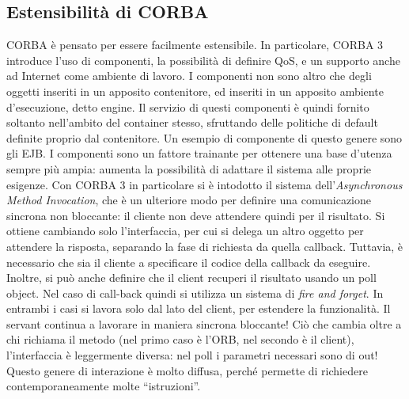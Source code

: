\subsection{Estensibilità di CORBA}
CORBA è pensato per essere facilmente estensibile. In particolare, CORBA 3 introduce l'uso di componenti, la possibilità
di definire QoS, e un supporto anche ad Internet come ambiente di lavoro.
I componenti non sono altro che degli oggetti inseriti in un apposito contenitore, ed inseriti in un apposito ambiente
d'esecuzione, detto engine. Il servizio di questi componenti è quindi fornito soltanto nell'ambito del container stesso,
sfruttando delle politiche di default definite proprio dal contenitore. Un esempio di componente di questo genere sono
gli EJB.
I componenti sono un fattore trainante per ottenere una base d'utenza sempre più ampia: aumenta la possibilità di
adattare il sistema alle proprie esigenze.
Con CORBA 3 in particolare si è intodotto il sistema dell'\textit{Asynchronous Method Invocation}, che è un ulteriore
modo per definire una comunicazione sincrona non bloccante: il cliente non deve attendere quindi per il risultato.
Si ottiene cambiando solo l'interfaccia, per cui si delega un altro oggetto per attendere la risposta, separando la fase
di richiesta da quella callback. Tuttavia, è necessario che sia il cliente a specificare il codice della callback da
eseguire.
Inoltre, si può anche definire che il client recuperi il risultato usando un poll object. Nel caso di call-back quindi
si utilizza un sistema di \textit{fire and forget}. In entrambi i casi si lavora solo dal lato del client, per estendere
la funzionalità.
Il servant continua a lavorare in maniera sincrona bloccante! Ciò che cambia oltre a chi richiama il metodo (nel primo
caso è l'ORB, nel secondo è il client), l'interfaccia è leggermente diversa: nel poll i parametri necessari sono di out!
Questo genere di interazione è molto diffusa, perché permette di richiedere contemporaneamente molte ``istruzioni''.
